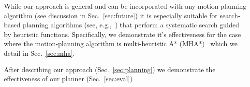 \documentclass[conference]{IEEEtran}
\begin{document}
%

While our approach is general and can be incorporated with any motion-planning algorithm (see discussion in Sec.~\ref{sec:future}) it is especially suitable for search-based planning algorithms (see, e.g.,~\cite{CCL14}) that perform a systematic search guided by heuristic functions.
Specifically, we demonstrate it's effectiveness for the case where the motion-planning algorithm is multi-heuristic A* (MHA*)~\cite{ASNHL16, NAL15} which we detail in Sec.~\ref{sec:mha}.




After describing our approach (Sec.~\ref{sec:planning}) we demonstrate the effectiveness of our planner (Sec.~\ref{sec:eval})
\end{document}
